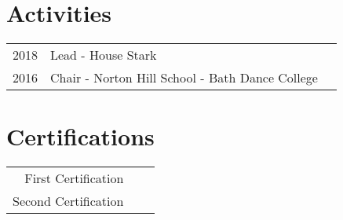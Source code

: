 \documentclass[]{ds-resume}
\begin{document}
\begin{minipage}[t]{0.66\textwidth}

\section{Activities} 

\begin{tabular}{rll}
2018 	& Lead - House Stark \\
2016 	& Chair - Norton Hill School - Bath Dance College \\
\end{tabular}
\sectionsep


\section{Certifications} 
\begin{tabular}{rll}
First Certification \\
Second Certification \\
\end{tabular}
\sectionsep


\end{minipage} 
\end{document}
